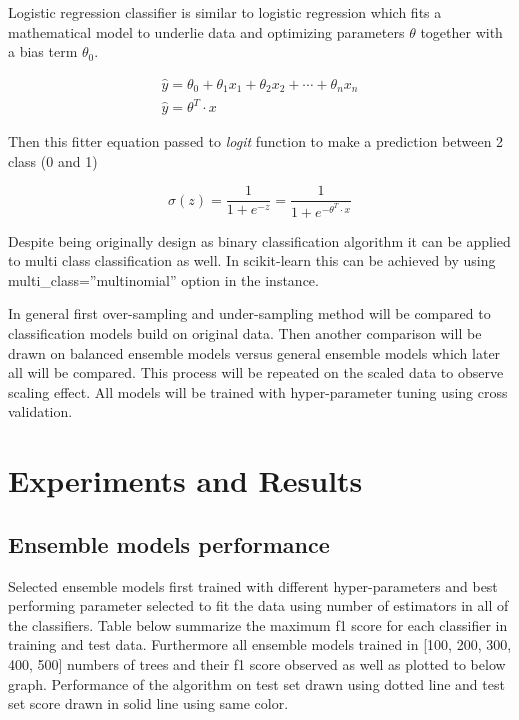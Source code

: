 \documentclass[12pt]{article}
\begin{document}
Logistic regression classifier is similar to logistic regression which fits a mathematical model to underlie data and optimizing parameters $\theta$ together with a bias term $\theta_{0}$.

\begin{gather*}
    \hat{y} = \theta_{0} + \theta_{1}x_{1} + \theta_{2}x_{2} + \cdots + \theta_{n}x_{n} \\
     \hat{y} = \theta^T \cdot x
\end{gather*}

Then this fitter equation passed to \textit{logit} function to make a prediction between 2 class (0 and 1)

\begin{equation*}
    \sigma(z) = \frac{1}{1 + e^{-z}} = \frac{1}{1 + e^{-\theta^T \cdot x}}
\end{equation*}

Despite being originally design as binary classification algorithm it can be applied to multi class classification as well. In scikit-learn this can be achieved by using multi\_class=”multinomial” option in the instance.


In general first over-sampling and under-sampling method will be compared to classification models build on original data. Then another comparison will be drawn on balanced ensemble models versus general ensemble models which later all will be compared. This process will be repeated on the scaled data to observe scaling effect. All models will be trained with hyper-parameter tuning using cross validation.

\section{Experiments and Results} \label{sec:experiment}
\subsection{Ensemble models performance} \label{subse:ensemblemodelperformance}
Selected ensemble models first trained with different hyper-parameters and best performing parameter selected to fit the data using number of estimators in all of the classifiers. Table below summarize the maximum f1 score for each classifier in training and test data. Furthermore all ensemble models trained in [100, 200, 300, 400, 500] numbers of trees and their f1 score observed as well as plotted to below graph. Performance of the algorithm on test set drawn using dotted line and test set score drawn in solid line using same color.
\end{document}
